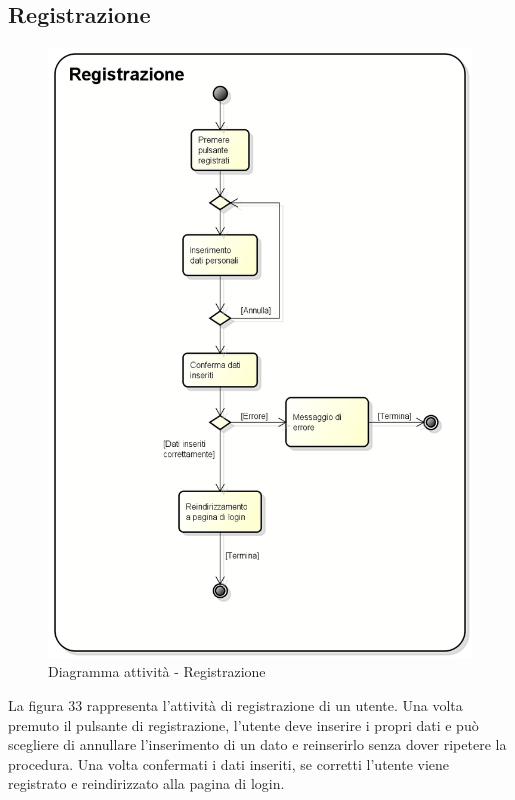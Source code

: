 \subsection{Registrazione}
\begin{figure}[h] 
	\centering 
	\includegraphics[scale=0.3] {img/activity_registrazione.png} 
	\caption{Diagramma attività - Registrazione} 
\end{figure}
La figura 33 rappresenta l'attività di registrazione di un utente. Una volta premuto il pulsante di registrazione, l'utente deve inserire i propri dati e può scegliere di annullare l'inserimento di un dato e reinserirlo senza dover ripetere la procedura. Una volta confermati i dati inseriti, se corretti l'utente viene registrato e reindirizzato alla pagina di login.
\newpage


